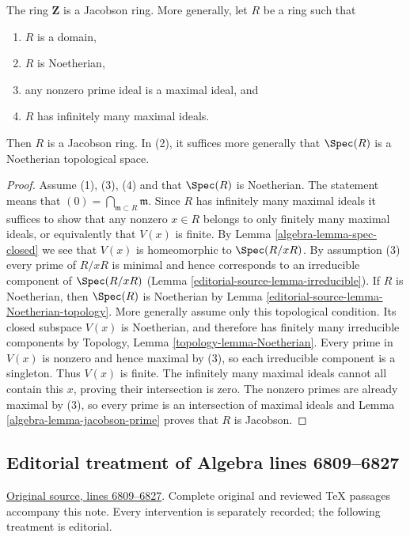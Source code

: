 \begin{lemma}
\label{editorial-source-lemma-pid-jacobson}
The ring $\mathbf{Z}$ is a Jacobson ring.
More generally, let $R$ be a ring such that
\begin{enumerate}
\item $R$ is a domain,
\item $R$ is Noetherian,
\item any nonzero prime ideal is a maximal ideal, and
\item $R$ has infinitely many maximal ideals.
\end{enumerate}
Then $R$ is a Jacobson ring. In (2), it suffices more generally
that $\Spec(R)$ is a Noetherian topological space.
\end{lemma}

\begin{proof}
Assume (1), (3), (4) and that $\Spec(R)$ is Noetherian. The statement
means that $(0) = \bigcap_{\mathfrak m \subset R} \mathfrak m$.
Since $R$ has infinitely many maximal ideals it suffices to
show that any nonzero $x\in R$ belongs to only finitely many
maximal ideals, or equivalently that $V(x)$ is finite.
By Lemma \ref{algebra-lemma-spec-closed}
we see that $V(x)$ is homeomorphic to $\Spec(R/xR)$.
By assumption (3) every prime of $R/xR$ is minimal and hence
corresponds to an irreducible component of $\Spec(R/xR)$
(Lemma \ref{editorial-source-lemma-irreducible}).
If $R$ is Noetherian, then $\Spec(R)$ is Noetherian by
Lemma \ref{editorial-source-lemma-Noetherian-topology}. More generally assume only
this topological condition. Its closed subspace $V(x)$ is Noetherian,
and therefore has finitely many irreducible components by Topology,
Lemma \ref{topology-lemma-Noetherian}. Every prime in $V(x)$ is
nonzero and hence maximal by (3), so each irreducible component is
a singleton. Thus $V(x)$ is finite. The infinitely many maximal
ideals cannot all contain this $x$, proving their intersection is zero.
The nonzero primes are already maximal by (3), so every prime is an
intersection of maximal ideals and Lemma \ref{algebra-lemma-jacobson-prime}
proves that $R$ is Jacobson.
\end{proof}


\subsection{Editorial treatment of Algebra lines 6809--6827}

\hypertarget{algebra-context-058}{}

\noindent\href{https://github.com/stacks/stacks-project/blob/a04446e57ec1fbc252a871afcec7752fb2807b14/algebra.tex\#L6809}{Original source, lines 6809--6827}. Complete original and reviewed TeX passages accompany this note. Every intervention is separately recorded; the following treatment is editorial.


